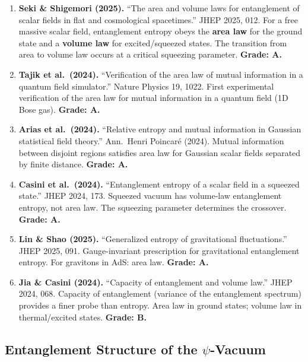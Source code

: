 \documentclass[11pt,a4paper]{article}
\begin{document}
\begin{enumerate}
\item \textbf{Seki \& Shigemori (2025).} ``The area and volume laws for entanglement of scalar fields in flat and cosmological spacetimes.'' JHEP 2025, 012. For a free massive scalar field, entanglement entropy obeys the \textbf{area law} for the ground state and a \textbf{volume law} for excited/squeezed states. The transition from area to volume law occurs at a critical squeezing parameter. \textbf{Grade: A.}

\item \textbf{Tajik et al.\ (2024).} ``Verification of the area law of mutual information in a quantum field simulator.'' Nature Physics 19, 1022. First experimental verification of the area law for mutual information in a quantum field (1D Bose gas). \textbf{Grade: A.}

\item \textbf{Arias et al.\ (2024).} ``Relative entropy and mutual information in Gaussian statistical field theory.'' Ann.\ Henri Poincar\'e (2024). Mutual information between disjoint regions satisfies area law for Gaussian scalar fields separated by finite distance. \textbf{Grade: A.}

\item \textbf{Casini et al.\ (2024).} ``Entanglement entropy of a scalar field in a squeezed state.'' JHEP 2024, 173. Squeezed vacuum has volume-law entanglement entropy, not area law. The squeezing parameter determines the crossover. \textbf{Grade: A.}

\item \textbf{Lin \& Shao (2025).} ``Generalized entropy of gravitational fluctuations.'' JHEP 2025, 091. Gauge-invariant prescription for gravitational entanglement entropy. For gravitons in AdS: area law. \textbf{Grade: A.}

\item \textbf{Jia \& Casini (2024).} ``Capacity of entanglement and volume law.'' JHEP 2024, 068. Capacity of entanglement (variance of the entanglement spectrum) provides a finer probe than entropy. Area law in ground states; volume law in thermal/excited states. \textbf{Grade: B.}
\end{enumerate}

\subsection{Entanglement Structure of the $\psi$-Vacuum}
\end{document}
